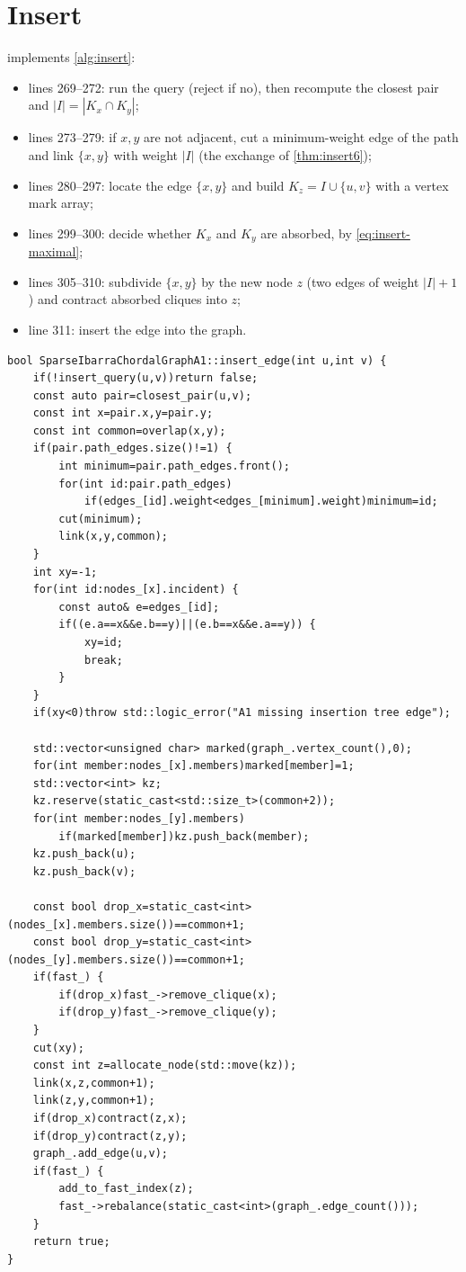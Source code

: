 \documentclass[11pt,a4paper,oneside]{report}
\theoremstyle{plain}
\theoremstyle{definition}
\theoremstyle{remark}
\newcommand{\no}{\textsf{no}}
\newcommand{\op}[1]{\textsf{#1}}
\DeclareRobustCommand{\file}[1]{\mtp_breakable_tt:n {#1}}
\begin{document}
\section{Insert}\label{sec:a1-insert}
 implements \cref{alg:insert}:
\begin{itemize}
\item lines 269--272: run the query (reject if \no), then recompute the closest pair and
  \(|I|=|K_x\cap K_y|\);
\item lines 273--279: if \(x,y\) are not adjacent, cut a minimum-weight edge of the path and
  link \(\{x,y\}\) with weight \(|I|\) (the exchange of \cref{thm:insert6});
\item lines 280--297: locate the edge \(\{x,y\}\) and build \(K_z=I\cup\{u,v\}\) with a vertex
  mark array;
\item lines 299--300: decide whether \(K_x\) and \(K_y\) are absorbed, by
  \eqref{eq:insert-maximal};
\item lines 305--310: subdivide \(\{x,y\}\) by the new node \(z\) (two edges of weight
  \(|I|+1\)) and contract absorbed cliques into \(z\);
\item line 311: insert the edge into the graph.
\end{itemize}

\begin{lstlisting}[style=cpp,firstnumber=268,caption={\file{src/sparse_ibarra_a1.cpp}, lines 268--317: \op{Insert} (\cref{alg:insert}).},label={lst:a1-insert}]
bool SparseIbarraChordalGraphA1::insert_edge(int u,int v) {
    if(!insert_query(u,v))return false;
    const auto pair=closest_pair(u,v);
    const int x=pair.x,y=pair.y;
    const int common=overlap(x,y);
    if(pair.path_edges.size()!=1) {
        int minimum=pair.path_edges.front();
        for(int id:pair.path_edges)
            if(edges_[id].weight<edges_[minimum].weight)minimum=id;
        cut(minimum);
        link(x,y,common);
    }
    int xy=-1;
    for(int id:nodes_[x].incident) {
        const auto& e=edges_[id];
        if((e.a==x&&e.b==y)||(e.b==x&&e.a==y)) {
            xy=id;
            break;
        }
    }
    if(xy<0)throw std::logic_error("A1 missing insertion tree edge");

    std::vector<unsigned char> marked(graph_.vertex_count(),0);
    for(int member:nodes_[x].members)marked[member]=1;
    std::vector<int> kz;
    kz.reserve(static_cast<std::size_t>(common+2));
    for(int member:nodes_[y].members)
        if(marked[member])kz.push_back(member);
    kz.push_back(u);
    kz.push_back(v);

    const bool drop_x=static_cast<int>(nodes_[x].members.size())==common+1;
    const bool drop_y=static_cast<int>(nodes_[y].members.size())==common+1;
    if(fast_) {
        if(drop_x)fast_->remove_clique(x);
        if(drop_y)fast_->remove_clique(y);
    }
    cut(xy);
    const int z=allocate_node(std::move(kz));
    link(x,z,common+1);
    link(z,y,common+1);
    if(drop_x)contract(z,x);
    if(drop_y)contract(z,y);
    graph_.add_edge(u,v);
    if(fast_) {
        add_to_fast_index(z);
        fast_->rebalance(static_cast<int>(graph_.edge_count()));
    }
    return true;
}
\end{lstlisting}
\end{document}
